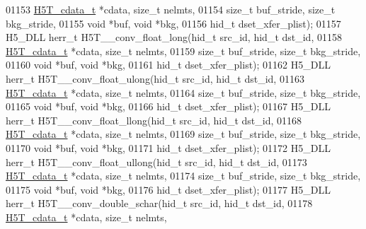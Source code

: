 \begin{DoxyCode}
01153                      \hyperlink{struct_h5_t__cdata__t}{H5T\_cdata\_t} *cdata, \textcolor{keywordtype}{size\_t} nelmts,
01154                      \textcolor{keywordtype}{size\_t} buf\_stride, \textcolor{keywordtype}{size\_t} bkg\_stride,
01155                                      \textcolor{keywordtype}{void} *buf, \textcolor{keywordtype}{void} *bkg,
01156                                      hid\_t dset\_xfer\_plist);
01157 H5\_DLL herr\_t H5T\_\_conv\_float\_long(hid\_t src\_id, hid\_t dst\_id,
01158                      \hyperlink{struct_h5_t__cdata__t}{H5T\_cdata\_t} *cdata, \textcolor{keywordtype}{size\_t} nelmts,
01159                      \textcolor{keywordtype}{size\_t} buf\_stride, \textcolor{keywordtype}{size\_t} bkg\_stride,
01160                                      \textcolor{keywordtype}{void} *buf, \textcolor{keywordtype}{void} *bkg,
01161                                      hid\_t dset\_xfer\_plist);
01162 H5\_DLL herr\_t H5T\_\_conv\_float\_ulong(hid\_t src\_id, hid\_t dst\_id,
01163                      \hyperlink{struct_h5_t__cdata__t}{H5T\_cdata\_t} *cdata, \textcolor{keywordtype}{size\_t} nelmts,
01164                      \textcolor{keywordtype}{size\_t} buf\_stride, \textcolor{keywordtype}{size\_t} bkg\_stride,
01165                                      \textcolor{keywordtype}{void} *buf, \textcolor{keywordtype}{void} *bkg,
01166                                      hid\_t dset\_xfer\_plist);
01167 H5\_DLL herr\_t H5T\_\_conv\_float\_llong(hid\_t src\_id, hid\_t dst\_id,
01168                      \hyperlink{struct_h5_t__cdata__t}{H5T\_cdata\_t} *cdata, \textcolor{keywordtype}{size\_t} nelmts,
01169                      \textcolor{keywordtype}{size\_t} buf\_stride, \textcolor{keywordtype}{size\_t} bkg\_stride,
01170                                      \textcolor{keywordtype}{void} *buf, \textcolor{keywordtype}{void} *bkg,
01171                                      hid\_t dset\_xfer\_plist);
01172 H5\_DLL herr\_t H5T\_\_conv\_float\_ullong(hid\_t src\_id, hid\_t dst\_id,
01173                      \hyperlink{struct_h5_t__cdata__t}{H5T\_cdata\_t} *cdata, \textcolor{keywordtype}{size\_t} nelmts,
01174                      \textcolor{keywordtype}{size\_t} buf\_stride, \textcolor{keywordtype}{size\_t} bkg\_stride,
01175                                      \textcolor{keywordtype}{void} *buf, \textcolor{keywordtype}{void} *bkg,
01176                                      hid\_t dset\_xfer\_plist);
01177 H5\_DLL herr\_t H5T\_\_conv\_double\_schar(hid\_t src\_id, hid\_t dst\_id,
01178                      \hyperlink{struct_h5_t__cdata__t}{H5T\_cdata\_t} *cdata, \textcolor{keywordtype}{size\_t} nelmts,

\end{DoxyCode}
